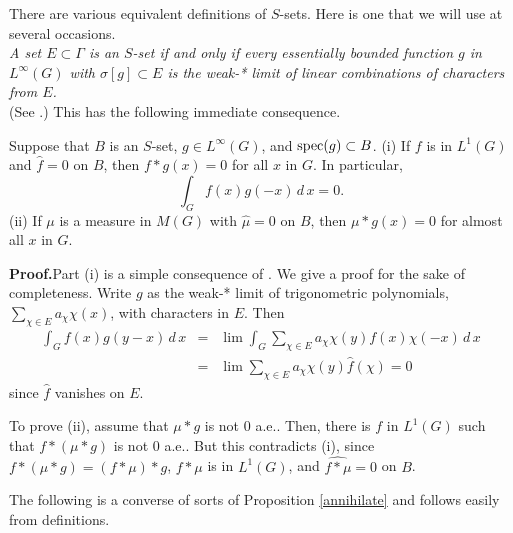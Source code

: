 \documentclass[12pt,leqno]{article}
\def\spec{{\rm spec}}
\begin{document}
There are various equivalent definitions of $S$-sets.
Here is one that we will use at several occasions.\\
{\em A set 
$E\subset \Gamma$ is an $S$-set if and only if
every essentially bounded function $g$ in $L^\infty(G)$
with $\sigma[g]\subset E$ is the weak-* limit 
of linear combinations of characters from $E$.}\\  
(See \cite[(40.23) (a)]{hr2}.)  This has 
the following immediate consequence.

\begin{prop}
Suppose that $B$ is an $S$-set, $g\in L^\infty(G)$,
 and 
$\spec (g)\subset B$.  
(i)  If $f$ is in $L^1(G)$ and 
$\widehat{f}=0$ on $B$, then
$f*g(x)=0$ for all $x$ in $G$.  In particular, 
$$\int_G f(x) g(-x)\, d\, x =0.$$
(ii)  If $\mu$ is a measure in $M(G)$
with $\widehat{\mu}=0$ on $B$, then
$\mu*g(x)=0$ for almost all $x$ in $G$.
\label{annihilate}
\end{prop}

{\bf Proof.}\quad Part (i) is a simple consequence of
\cite[Theorems (40.8) and (40.10)]{hr2}.
We give a proof for the sake of completeness.
Write $g$ as the weak-* limit of 
trigonometric polynomials,
$\sum_{\chi\in E} a_\chi \chi(x)$,
 with characters in $E$.  Then
\begin{eqnarray*}
\int_G f(x)g(y-x)\, d\,x &=& \lim \int_G 
\sum_{\chi\in E} a_\chi \chi(y)f(x)\chi(-x)\, d\,x\\
&=&\lim  
\sum_{\chi\in E} a_\chi \chi(y) \widehat{f}(\chi)=0
\end{eqnarray*} 
since $\widehat{f}$ vanishes on $E$.

To prove (ii), assume that $\mu*g$ is not 0 a.e..  
Then, there is $f$ in $L^1(G)$ such that
$f*(\mu*g)$ is not 0 a.e..  But this contradicts (i),
since $f*(\mu*g)=(f*\mu)*g$, $f*\mu$ is in $L^1(G)$,
and $\widehat{f*\mu}=0$ on $B$.
    









The following is a converse of sorts of Proposition
\ref{annihilate} and follows easily from definitions.
\end{document}
